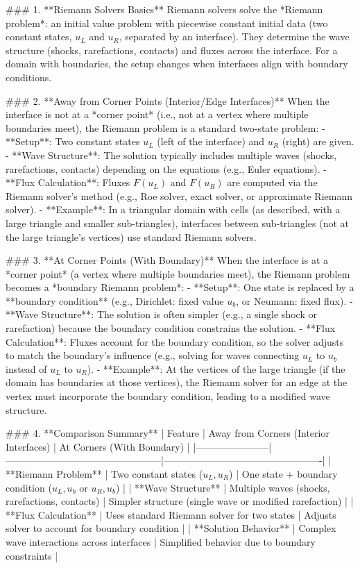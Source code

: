 ### 1. **Riemann Solvers Basics**  
Riemann solvers solve the *Riemann problem*: an initial value problem with piecewise constant initial data (two constant states, \( u_L \) and \( u_R \), separated by an interface). They determine the wave structure (shocks, rarefactions, contacts) and fluxes across the interface. For a domain with boundaries, the setup changes when interfaces align with boundary conditions.  


### 2. **Away from Corner Points (Interior/Edge Interfaces)**  
When the interface is not at a *corner point* (i.e., not at a vertex where multiple boundaries meet), the Riemann problem is a standard two-state problem:  
- **Setup**: Two constant states \( u_L \) (left of the interface) and \( u_R \) (right) are given.  
- **Wave Structure**: The solution typically includes multiple waves (shocks, rarefactions, contacts) depending on the equations (e.g., Euler equations).  
- **Flux Calculation**: Fluxes \( F(u_L) \) and \( F(u_R) \) are computed via the Riemann solver’s method (e.g., Roe solver, exact solver, or approximate Riemann solver).  
- **Example**: In a triangular domain with cells (as described, with a large triangle and smaller sub-triangles), interfaces between sub-triangles (not at the large triangle’s vertices) use standard Riemann solvers.  


### 3. **At Corner Points (With Boundary)**  
When the interface is at a *corner point* (a vertex where multiple boundaries meet), the Riemann problem becomes a *boundary Riemann problem*:  
- **Setup**: One state is replaced by a **boundary condition** (e.g., Dirichlet: fixed value \( u_b \), or Neumann: fixed flux).  
- **Wave Structure**: The solution is often simpler (e.g., a single shock or rarefaction) because the boundary condition constrains the solution.  
- **Flux Calculation**: Fluxes account for the boundary condition, so the solver adjusts to match the boundary’s influence (e.g., solving for waves connecting \( u_L \) to \( u_b \) instead of \( u_L \) to \( u_R \)).  
- **Example**: At the vertices of the large triangle (if the domain has boundaries at those vertices), the Riemann solver for an edge at the vertex must incorporate the boundary condition, leading to a modified wave structure.  


### 4. **Comparison Summary**  
| Feature               | Away from Corners (Interior Interfaces)       | At Corners (With Boundary)                     |  
|-----------------------|------------------------------------------------|-------------------------------------------------|  
| **Riemann Problem**   | Two constant states (\( u_L, u_R \))          | One state + boundary condition (\( u_L, u_b \) or \( u_R, u_b \)) |  
| **Wave Structure**    | Multiple waves (shocks, rarefactions, contacts) | Simpler structure (single wave or modified rarefaction) |  
| **Flux Calculation**  | Uses standard Riemann solver for two states    | Adjusts solver to account for boundary condition |  
| **Solution Behavior** | Complex wave interactions across interfaces    | Simplified behavior due to boundary constraints |  


